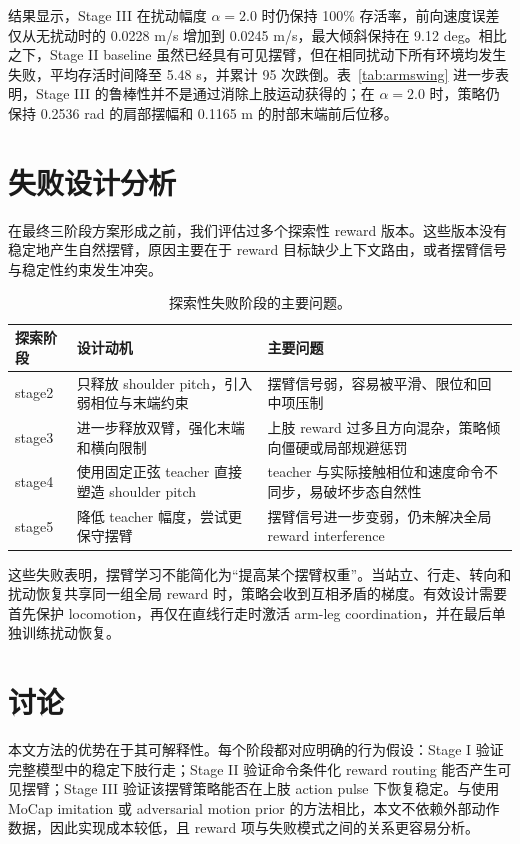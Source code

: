\documentclass{article}
\begin{document}
结果显示，Stage III 在扰动幅度 $\alpha=2.0$ 时仍保持 100\% 存活率，前向速度误差仅从无扰动时的 0.0228 m/s 增加到 0.0245 m/s，最大倾斜保持在 9.12 deg。相比之下，Stage II baseline 虽然已经具有可见摆臂，但在相同扰动下所有环境均发生失败，平均存活时间降至 5.48 s，并累计 95 次跌倒。表~\ref{tab:armswing} 进一步表明，Stage III 的鲁棒性并不是通过消除上肢运动获得的；在 $\alpha=2.0$ 时，策略仍保持 0.2536 rad 的肩部摆幅和 0.1165 m 的肘部末端前后位移。

\section{失败设计分析}

在最终三阶段方案形成之前，我们评估过多个探索性 reward 版本。这些版本没有稳定地产生自然摆臂，原因主要在于 reward 目标缺少上下文路由，或者摆臂信号与稳定性约束发生冲突。

\begin{table}[t]
  \caption{探索性失败阶段的主要问题。}
  \label{tab:failed}
  \centering
  \small
  \begin{tabularx}{\linewidth}{lXX}
    \toprule
    探索阶段 & 设计动机 & 主要问题 \\
    \midrule
    stage2 & 只释放 shoulder pitch，引入弱相位与末端约束 & 摆臂信号弱，容易被平滑、限位和回中项压制 \\
    stage3 & 进一步释放双臂，强化末端和横向限制 & 上肢 reward 过多且方向混杂，策略倾向僵硬或局部规避惩罚 \\
    stage4 & 使用固定正弦 teacher 直接塑造 shoulder pitch & teacher 与实际接触相位和速度命令不同步，易破坏步态自然性 \\
    stage5 & 降低 teacher 幅度，尝试更保守摆臂 & 摆臂信号进一步变弱，仍未解决全局 reward interference \\
    \bottomrule
  \end{tabularx}
\end{table}

这些失败表明，摆臂学习不能简化为“提高某个摆臂权重”。当站立、行走、转向和扰动恢复共享同一组全局 reward 时，策略会收到互相矛盾的梯度。有效设计需要首先保护 locomotion，再仅在直线行走时激活 arm-leg coordination，并在最后单独训练扰动恢复。

\section{讨论}

本文方法的优势在于其可解释性。每个阶段都对应明确的行为假设：Stage I 验证完整模型中的稳定下肢行走；Stage II 验证命令条件化 reward routing 能否产生可见摆臂；Stage III 验证该摆臂策略能否在上肢 action pulse 下恢复稳定。与使用 MoCap imitation 或 adversarial motion prior 的方法相比，本文不依赖外部动作数据，因此实现成本较低，且 reward 项与失败模式之间的关系更容易分析。
\end{document}
